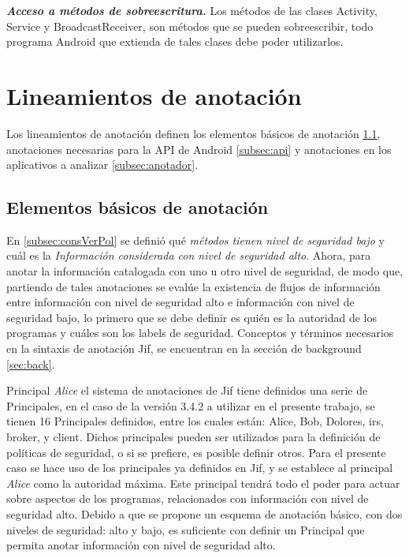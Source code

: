 \textit{\textbf{Acceso a métodos de sobreescritura.}}\newline
Los métodos de las clases Activity, Service y BroadcastReceiver, son métodos
que se pueden sobreescribir, todo programa Android que extienda de tales clases
debe poder utilizarlos.

\section{Lineamientos de anotación}
\label{sec:lineamientos}
Los lineamientos de anotación definen los elementos básicos de anotación
\ref{subsec:elements}, anotaciones necesarias para la API de Android
\ref{subsec:api} y anotaciones en los aplicativos a analizar \ref{subsec:anotador}.

\subsection{Elementos básicos de anotación}
\label{subsec:elements}
En \ref{subsec:consVerPol} se definió qué \textit{métodos tienen nivel de
seguridad bajo} y cuál es la \textit{Información considerada con nivel de
seguridad alto}. 
Ahora, para anotar la información catalogada con uno u otro nivel de seguridad,
de modo que, partiendo de tales anotaciones se evalúe la existencia de flujos de
información entre información con nivel de seguridad alto e información con
nivel de seguridad bajo, lo primero que se debe definir es quién es la autoridad
de los programas y cuáles son los labels de seguridad.\newline 
Conceptos y términos necesarios en la sintaxis de anotación Jif, se encuentran
en la sección de background \ref{sec:back}.

Principal \emph{Alice}\newline
el sistema de anotaciones de Jif tiene definidos una serie de Principales, en
el caso de la versión 3.4.2\cite{Jif-compiler} a utilizar en el presente
trabajo, se tienen 16 Principales definidos, entre los cuales están: Alice, Bob, Dolores, irs,
broker, y client. Dichos principales pueden ser utilizados para la definición de
políticas de seguridad, o si se prefiere, es posible definir otros.
Para el presente caso se hace uso de los principales ya definidos en Jif, y se
establece al principal \emph{Alice} como la autoridad máxima. Este principal
tendrá todo el poder para actuar sobre aspectos de los programas,
relacionados con información con nivel de seguridad alto.\newline 
Debido a que se propone un esquema de anotación básico, con dos niveles de
seguridad: alto y bajo, es suficiente con definir un Principal que permita
anotar información con nivel de seguridad alto.


